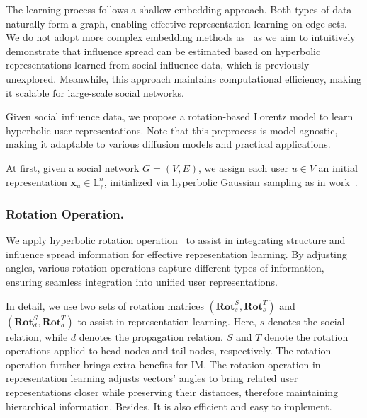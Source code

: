 
The learning process follows a shallow embedding approach.
Both types of data naturally form a graph, enabling effective representation learning on edge sets.
We do not adopt more complex embedding methods as~\cite{KDD2016_grover_node2vec, KDD2017_ribeiro_struc2vec} as we aim to intuitively demonstrate that influence spread can be estimated based on hyperbolic representations learned from social influence data, which is previously unexplored.
Meanwhile, this approach maintains computational efficiency, making it scalable for large-scale social networks.

Given social influence data, we propose a rotation-based Lorentz model to learn hyperbolic user representations. 
Note that this preprocess is model-agnostic, making it adaptable to various diffusion models and practical applications. 

At first, given a social network $G = (V, E)$, we assign each user $u \in V$ an initial representation $\mathbf{x}_u \in \mathbb{L}^{n}_{\gamma}$, initialized via hyperbolic Gaussian sampling as in work~\cite{sun2021hgcf}.

\subsubsection{Rotation Operation.}
We apply hyperbolic rotation operation~\cite{ICLR19rotate, ACL20_chami2020low} to assist in integrating structure and influence spread information for effective representation learning. 
By adjusting angles, various rotation operations capture different types of information, ensuring seamless integration into unified user representations.

In detail, we use two sets of rotation matrices $(\mathbf{Rot}^{S}_{s}, \mathbf{Rot}^{T}_{s})$ and $(\mathbf{Rot}^{S}_{d}, \mathbf{Rot}^{T}_{d})$ to assist in representation learning. Here, $s$ denotes the social relation, while $d$ denotes the propagation relation. $S$ and $T$ denote the rotation operations applied to head nodes and tail nodes, respectively.
The rotation operation further brings extra benefits for IM.
The rotation operation in representation learning adjusts vectors' angles to bring related user representations closer while preserving their distances, therefore maintaining hierarchical information.
Besides, It is also efficient and easy to implement.


